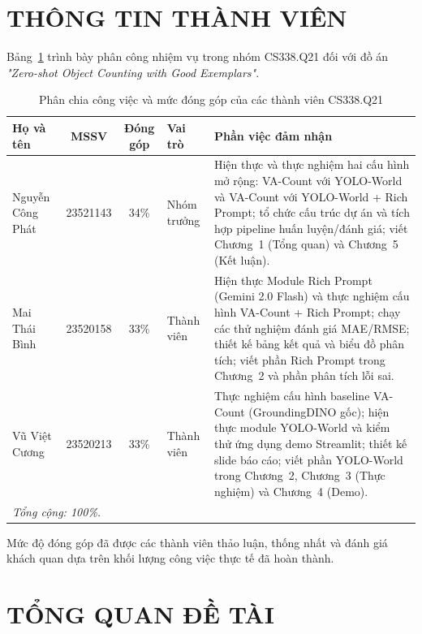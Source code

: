 \documentclass[a4paper,12pt]{report}
\numberwithin{figure}{chapter}
\numberwithin{table}{chapter}
\begin{document}
\chapter*{THÔNG TIN THÀNH VIÊN}

Bảng~\ref{tab:phan_cong} trình bày phân công nhiệm vụ trong nhóm CS338.Q21 đối với đồ án \textit{"Zero-shot Object Counting with Good Exemplars"}.

\begin{table}[H]
\centering
\renewcommand{\arraystretch}{1.25}
\begin{tabular}{|l|c|c|l|p{6cm}|}
\hline
\textbf{Họ và tên} & \textbf{MSSV} & \textbf{Đóng góp} & \textbf{Vai trò} & \textbf{Phần việc đảm nhận} \\
\hline
Nguyễn Công Phát & 23521143 & 34\% & Nhóm trưởng &
Hiện thực và thực nghiệm hai cấu hình mở rộng: VA-Count với YOLO-World và VA-Count với YOLO-World + Rich Prompt; tổ chức cấu trúc dự án và tích hợp pipeline huấn luyện/đánh giá; viết Chương~1 (Tổng quan) và Chương~5 (Kết luận). \\
\hline
Mai Thái Bình & 23520158 & 33\% & Thành viên &
Hiện thực Module Rich Prompt (Gemini 2.0 Flash) và thực nghiệm cấu hình VA-Count + Rich Prompt; chạy các thử nghiệm đánh giá MAE/RMSE; thiết kế bảng kết quả và biểu đồ phân tích; viết phần Rich Prompt trong Chương~2 và phần phân tích lỗi sai. \\
\hline
Vũ Việt Cương & 23520213 & 33\% & Thành viên &
Thực nghiệm cấu hình baseline VA-Count (GroundingDINO gốc); hiện thực module YOLO-World và kiểm thử ứng dụng demo Streamlit; thiết kế slide báo cáo; viết phần YOLO-World trong Chương~2, Chương~3 (Thực nghiệm) và Chương~4 (Demo). \\
\hline
\multicolumn{5}{|l|}{\textit{Tổng cộng: 100\%.}} \\
\hline
\end{tabular}
\caption{Phân chia công việc và mức đóng góp của các thành viên CS338.Q21}
\label{tab:phan_cong}
\end{table}

Mức độ đóng góp đã được các thành viên thảo luận, thống nhất và đánh giá khách quan dựa trên khối lượng công việc thực tế đã hoàn thành.

\chapter{TỔNG QUAN ĐỀ TÀI}
\label{ch:overview}
\end{document}

